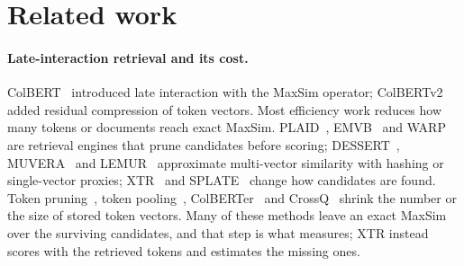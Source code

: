 \section{Related work}
\label{sec:related}

\paragraph{Late-interaction retrieval and its cost.}
ColBERT~\cite{khattab2020colbert} introduced late interaction with the MaxSim operator; ColBERTv2~\cite{santhanam2022colbertv2} added residual compression of token vectors.
Most efficiency work reduces how many tokens or documents reach exact MaxSim.
PLAID~\cite{santhanam2022plaid}, EMVB~\cite{nardini2024emvb} and WARP~\cite{scheerer2025warp} are retrieval engines that prune candidates before scoring; DESSERT~\cite{engels2023dessert}, MUVERA~\cite{dhulipala2024muvera} and LEMUR~\cite{jaasaari2026lemur} approximate multi-vector similarity with hashing or single-vector proxies; XTR~\cite{lee2023xtr} and SPLATE~\cite{formal2024splate} change how candidates are found.
Token pruning~\cite{lassance2022learnedpruning,schlatt2026tokenpruning}, token pooling~\cite{clavie2026tokenpooling}, ColBERTer~\cite{hofstatter2022colberter} and CrossQ~\cite{salla2026crossq} shrink the number or the size of stored token vectors.
Many of these methods leave an exact MaxSim over the surviving candidates, and that step is what \benchname measures; XTR instead scores with the retrieved tokens and estimates the missing ones.

